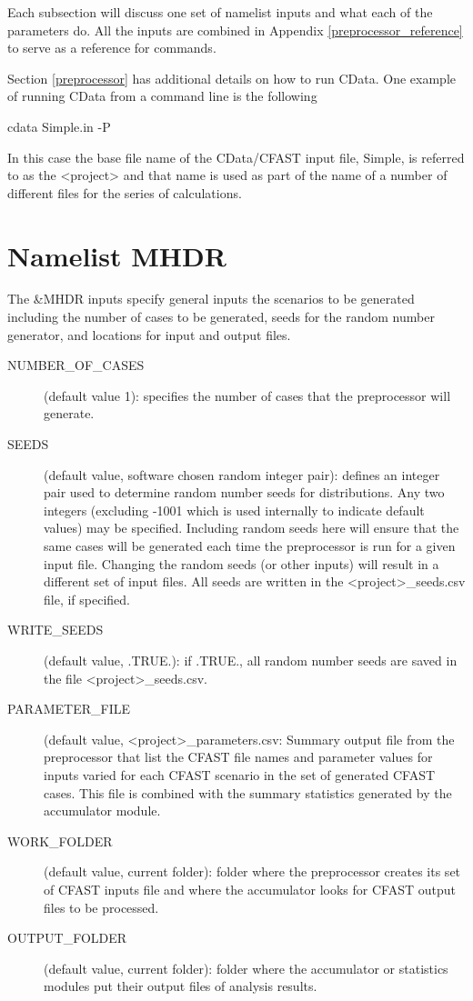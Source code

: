 \documentclass[12pt,twoside]{book}
\begin{document}
Each subsection will discuss one set of namelist inputs and what each of the parameters do. All the inputs are combined in Appendix \ref{preprocessor_reference}  to serve as a reference for commands.

Section \ref{preprocessor} has additional details on how to run CData. One example of running CData from a command line is the following

\vspace{\baselineskip}
{\ct cdata Simple.in -P}
\vspace{\baselineskip}

In this case the base file name of the CData/CFAST input file, {\ct Simple}, is referred to as the {\ct <project>} and that name is used as part of the name of a number of different files for the series of calculations.

\section{Namelist MHDR}
\label{info:MHDR}

The {\ct \&MHDR} inputs specify general inputs the scenarios to be generated including the number of cases to be generated, seeds for the random number generator, and locations for input and output files.

\begin{description}
  \item[NUMBER\_OF\_CASES] (default value 1): specifies the number of cases that the preprocessor will generate.
  \item[SEEDS] (default value, software chosen random integer pair): defines an integer pair used to determine random number seeds for distributions. Any two integers (excluding -1001 which is used internally to indicate default values) may be specified. Including random seeds here will ensure that the same cases will be generated each time the preprocessor is run for a given input file. Changing the random seeds (or other inputs) will result in a different set of input files.  All seeds are written in the {\ct <project>\_seeds.csv} file, if specified.
  \item[WRITE\_SEEDS] (default value, .TRUE.): if .TRUE., all random number seeds are saved in the file {\ct <project>\_seeds.csv}.
  \item[PARAMETER\_FILE] (default value, {\ct <project>\_parameters.csv}: Summary output file from the preprocessor that list the CFAST file names and parameter values for inputs varied for each CFAST scenario in the set of generated CFAST cases. This file is combined with the summary statistics generated by the accumulator module.
  \item[WORK\_FOLDER] (default value, current folder): folder where the preprocessor creates its set of CFAST inputs file and where the accumulator looks for CFAST output files to be processed.
  \item[OUTPUT\_FOLDER] (default value, current folder): folder where the accumulator or statistics modules put their output files of analysis results.
\end{description}
\end{document}

